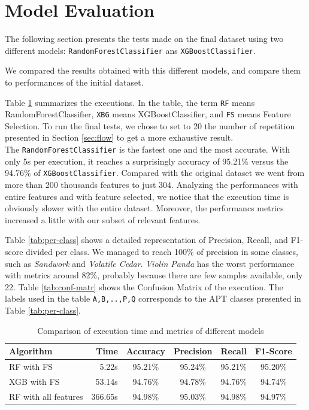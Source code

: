 \section{Model Evaluation}

The following section presents the tests made on the final dataset using two different models: \texttt{RandomForestClassifier} ans \texttt{XGBoostClassifier}.

We compared the results obtained with this different models, and compare them to performances of the initial dataset.

Table \ref{tab:final} summarizes the executions. In the table, the term \texttt{RF} means RandomForestClassifier, \texttt{XBG} means XGBoostClassifier, and \texttt{FS} means Feature Selection. To run the final tests, we chose to set  to 20 the number of repetition presented in Section \ref{sec:flow} to get a more exhaustive result.\\
The \texttt{RandomForestClassifier} is the fastest one and the most accurate. With only 5s per execution, it reaches a surprisingly accuracy of 95.21\% versus the 94.76\% of \texttt{XGBoostClassifier}. Compared with the original dataset we went from more than 200 thousands features to just 304. Analyzing the performances with entire features and with feature selected, we notice that the execution time is obviously slower with the entire dataset. Moreover, the performancs metrics increased a little with our subset of relevant features.

Table \ref{tab:per-class} shows a detailed representation of Precision, Recall, and F1-score divided per class. We managed to reach 100\% of precision in some classes, such as \textit{Sandwork} and \textit{Volatile Cedar}. \textit{Violin Panda} has the worst performance with metrics around 82\%, probably because there are few samples available, only 22. Table
\ref{tab:conf-matr} shows the Confusion Matrix of the execution. The labels used in the table \texttt{A,B,..,P,Q} corresponds to the APT classes presented in Table \ref{tab:per-class}. 
\begin{table}[!h]
	\centering
	\caption{Comparison of execution time and metrics of different models}
	\label{tab:final}
	\begin{tabular}{lrcccc}
		\toprule
		\textbf{Algorithm}                          & \textbf{Time}    & \textbf{Accuracy} & \textbf{Precision} & \textbf{Recall}  & \textbf{F1-Score} \\
		\midrule
		RF with FS & 5.22s   & 95.21\%  & 95.24\%   & 95.21\% & 95.20\%  \\
		XGB with FS      & 53.14s & 94.76\%  & 94.78\%   & 94.76\% & 94.74\%  \\
		RF with all features   &  366.65s  & 94.98\% &       95.03\%    &   94.98\%      & 94.97\%\\
		\bottomrule         
	\end{tabular}
\end{table}


